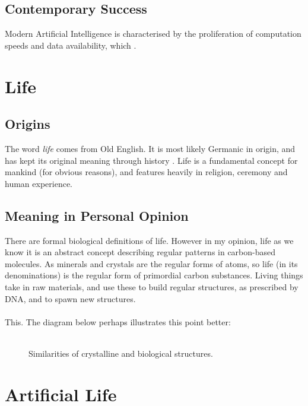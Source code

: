 \documentclass[10pt,a4paper]{article}
\begin{document}
			\subsection{Contemporary Success}
				Modern Artificial Intelligence is characterised by the proliferation of computation speeds and data availability, which .
		
		\pagebreak
		\section{Life}
		
			\subsection{Origins}
		
				The word \textsl{life} comes from Old English. It is most likely Germanic in origin, and has kept its original meaning through history \cites{etymonline2017}. Life is a fundamental concept for mankind (for obvious reasons), and features heavily in religion, ceremony and human experience.
	
			\subsection{Meaning in Personal Opinion}
	
				There are formal biological definitions of life. However in my opinion, life as we know it is an abstract concept describing regular patterns in carbon-based molecules. As minerals and crystals are the regular forms of atoms, so life (in its denominations) is the regular form of primordial carbon substances. Living things take in raw materials, and use these to build regular structures, as prescribed by DNA, and to spawn new structures. 
				\\\\
				This. The diagram below perhaps illustrates this point better:
				\\\\
				\begin{figure}[h]
					\centering
					\qquad
					\caption{Similarities of crystalline and biological structures.}%
					\label{fig:example}%
				\end{figure}
				
		
		\pagebreak
		\section{Artificial Life}
		
\end{document}
